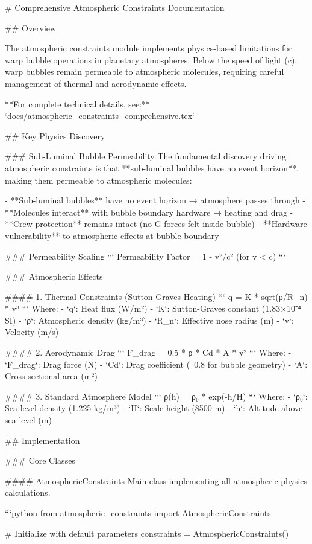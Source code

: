 # Comprehensive Atmospheric Constraints Documentation

## Overview

The atmospheric constraints module implements physics-based limitations for warp bubble operations in planetary atmospheres. Below the speed of light (c), warp bubbles remain permeable to atmospheric molecules, requiring careful management of thermal and aerodynamic effects.

**For complete technical details, see:** `docs/atmospheric_constraints_comprehensive.tex`

## Key Physics Discovery

### Sub-Luminal Bubble Permeability
The fundamental discovery driving atmospheric constraints is that **sub-luminal bubbles have no event horizon**, making them permeable to atmospheric molecules:

- **Sub-luminal bubbles** have no event horizon → atmosphere passes through
- **Molecules interact** with bubble boundary hardware → heating and drag
- **Crew protection** remains intact (no G-forces felt inside bubble)
- **Hardware vulnerability** to atmospheric effects at bubble boundary

### Permeability Scaling
```
Permeability Factor = 1 - v²/c²  (for v < c)
```

### Atmospheric Effects

#### 1. Thermal Constraints (Sutton-Graves Heating)
```
q = K * sqrt(ρ/R_n) * v³
```
Where:
- `q`: Heat flux (W/m²)
- `K`: Sutton-Graves constant (1.83×10⁻⁴ SI)
- `ρ`: Atmospheric density (kg/m³)
- `R_n`: Effective nose radius (m)
- `v`: Velocity (m/s)

#### 2. Aerodynamic Drag
```
F_drag = 0.5 * ρ * Cd * A * v²
```
Where:
- `F_drag`: Drag force (N)
- `Cd`: Drag coefficient (~0.8 for bubble geometry)
- `A`: Cross-sectional area (m²)

#### 3. Standard Atmosphere Model
```
ρ(h) = ρ₀ * exp(-h/H)
```
Where:
- `ρ₀`: Sea level density (1.225 kg/m³)
- `H`: Scale height (8500 m)
- `h`: Altitude above sea level (m)

## Implementation

### Core Classes

#### AtmosphericConstraints
Main class implementing all atmospheric physics calculations.

```python
from atmospheric_constraints import AtmosphericConstraints

# Initialize with default parameters
constraints = AtmosphericConstraints()

